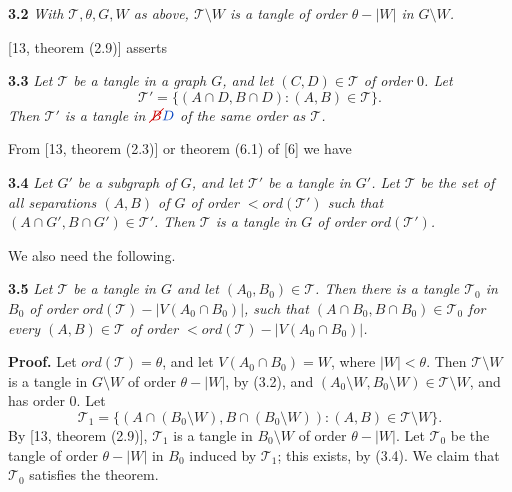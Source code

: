 \textbf{3.2} \textit{With $\mathcal{T}, \theta, G, W$ as above, $\mathcal{T} \setminus W$ is a tangle of order $\theta - |W|$ in $G \setminus W$.}

[13, theorem (2.9)] asserts

\textbf{3.3} \textit{Let $\mathcal{T}$ be a tangle in a graph $G$, and let $(C, D) \in \mathcal{T}$ of order $0$. Let}
\begin{equation*}
\mathcal{T}' = \{(A \cap D, B \cap D) : (A, B) \in \mathcal{T}\}.
\end{equation*}
\textit{Then $\mathcal{T}'$ is a tangle in $\delm{B}\fix{D}$ of the same order as $\mathcal{T}$.}

From [13, theorem (2.3)] or theorem (6.1) of [6] we have

\textbf{3.4} \textit{Let $G'$ be a subgraph of $G$, and let $\mathcal{T}'$ be a tangle in $G'$. Let $\mathcal{T}$ be the set of all separations $(A, B)$ of $G$ of order $< ord(\mathcal{T}')$ such that $(A \cap G', B \cap G') \in \mathcal{T}'$. Then $\mathcal{T}$ is a tangle in $G$ of order $ord(\mathcal{T}')$.}

We also need the following.

\textbf{3.5} \textit{Let $\mathcal{T}$ be a tangle in $G$ and let $(A_0, B_0) \in \mathcal{T}$. Then there is a tangle $\mathcal{T}_0$ in $B_0$ of order $ord(\mathcal{T}) - |V(A_0 \cap B_0)|$, such that $(A \cap B_0, B \cap B_0) \in \mathcal{T}_0$ for every $(A, B) \in \mathcal{T}$ of order $< ord(\mathcal{T}) - |V(A_0 \cap B_0)|$.}

\textbf{Proof.} Let $ord(\mathcal{T}) = \theta$, and let $V(A_0 \cap B_0) = W$, where $|W| < \theta$. Then $\mathcal{T} \setminus W$ is a tangle in $G \setminus W$ of order $\theta - |W|$, by (3.2), and $(A_0 \setminus W, B_0 \setminus W) \in \mathcal{T} \setminus W$, and has order $0$. Let
\begin{equation*}
\mathcal{T}_1 = \{(A \cap (B_0 \setminus W), B \cap (B_0 \setminus W)) : (A, B) \in \mathcal{T} \setminus W\}.
\end{equation*}
By [13, theorem (2.9)], $\mathcal{T}_1$ is a tangle in $B_0 \setminus W$ of order $\theta - |W|$. Let $\mathcal{T}_0$ be the tangle of order $\theta - |W|$ in $B_0$ induced by $\mathcal{T}_1$; this exists, by (3.4). We claim that $\mathcal{T}_0$ satisfies the theorem.


